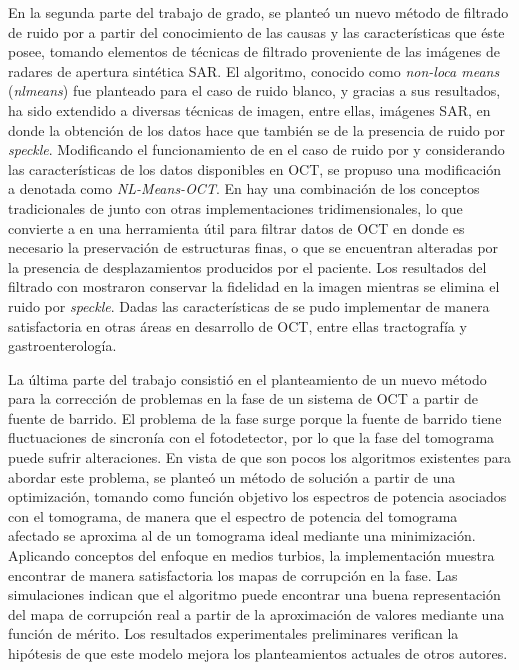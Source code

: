 En la segunda parte del trabajo de grado, se planteó un nuevo método de filtrado de ruido por \speckle a partir del conocimiento de las causas y las características que éste posee, tomando elementos de técnicas de filtrado proveniente de las imágenes de radares de apertura sintética SAR. El algoritmo, conocido como \textit{non-loca means} (\textit{nlmeans}) fue planteado para el caso de ruido blanco, y gracias a sus resultados, ha sido extendido a diversas técnicas de imagen, entre ellas, imágenes SAR, en donde la obtención de los datos hace que también se de la presencia de ruido por \textit{speckle}. Modificando el funcionamiento de \nlmeans en el caso de ruido por \speckle y considerando las características de los datos disponibles en OCT, se propuso una modificación a \nlmeans denotada como \textit{NL-Means-OCT}. En \nlmeansOCT hay una combinación de los conceptos tradicionales de \nlmeans junto con otras implementaciones tridimensionales, lo que convierte a \nlmeansOCT en una herramienta útil para filtrar datos de OCT en donde es necesario la preservación de estructuras finas, o que se encuentran alteradas por la presencia de desplazamientos producidos por el paciente. Los resultados del filtrado con \nlmeansOCT mostraron conservar la fidelidad en la imagen mientras se elimina el ruido por \textit{speckle}. Dadas las características de \nlmeansOCT se pudo implementar de manera satisfactoria en otras áreas en desarrollo de OCT, entre ellas tractografía y gastroenterología.

La última parte del trabajo consistió en el planteamiento de un nuevo método para la corrección de problemas en la fase de un sistema de OCT a partir de fuente de barrido. El problema de la fase surge porque la fuente de barrido tiene fluctuaciones de sincronía con el fotodetector, por lo que la fase del tomograma puede sufrir alteraciones. En vista de que son pocos los algoritmos existentes para abordar este problema, se planteó un método de solución a partir de una optimización, tomando como función objetivo los espectros de potencia asociados con el tomograma, de manera que el espectro de potencia del tomograma afectado se aproxima al de un tomograma ideal mediante una minimización. Aplicando conceptos del enfoque en medios turbios, la implementación muestra encontrar de manera satisfactoria los mapas de corrupción en la fase. Las simulaciones indican que el algoritmo puede encontrar una buena representación del mapa de corrupción real a partir de la aproximación de valores mediante una función de mérito. Los resultados experimentales preliminares verifican la hipótesis de que este modelo mejora los planteamientos actuales de otros autores.

